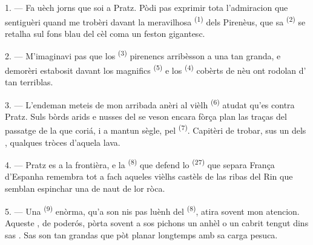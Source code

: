 
\VUsaut{4.0mm}
\VUsaut{3.0mm}

\VUsaut{3.0mm}

\VUsaut{3.0mm}

1. --- Fa uèch jorns que soi a Pratz. Pòdi pas exprimir tota l'admiracion que
sentiguèri quand me trobèri davant la meravilhosa 
\textsuperscript{(1)} dels Pirenèus, que sa  \textsuperscript{(2)}
se retalha sul fons blau del cèl coma un feston gigantesc.

2. --- M'imaginavi pas que los  \textsuperscript{(3)} pirenencs
arribèsson a una  tan granda, e demorèri estabosit davant los
magnifics  \textsuperscript{(5)} e los 
\textsuperscript{(4)} cobèrts de nèu ont rodolan d' tan
terriblas.

\VUsaut{3.0mm}
\VUsaut{3.0mm}

3. --- L'endeman meteis de mon arribada anèri al vièlh 
\textsuperscript{(6)} atudat qu'es contra Pratz. Suls bòrds arids e nusses del
 se veson encara fòrça plan las traças del passatge de la
 que coriá, i a mantun sègle, pel 
\textsuperscript{(7)}. Capitèri de trobar, sus un dels ,
qualques tròces d'aquela lava.

4. --- Pratz es a la frontièra, e la  \textsuperscript{(8)} que
defend lo  \textsuperscript{(27)} que separa França d'Espanha
remembra tot a fach aqueles vièlhs castèls de las ribas del Rin que semblan
espinchar una  de naut de lor ròca.

5. --- Una  \textsuperscript{(9)} enòrma, qu'a son nis pas luènh del
 \textsuperscript{(8)}, atira sovent mon atencion. Aqueste
, de  poderós, pòrta sovent a sos pichons un
anhèl o un cabrit tengut dins sas . Sas  son tan
grandas que pòt planar longtemps amb sa carga pesuca.

